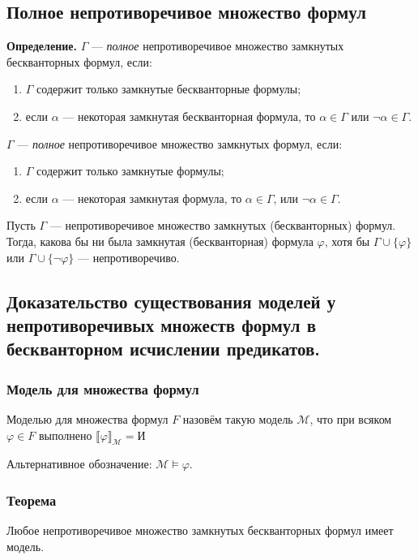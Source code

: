 \documentclass[10pt,a4paper,oneside]{article}
\begin{document}
\subsection{Полное непротиворечивое множество формул}
{\bf Определение.} $\Gamma$ --- \emph{полное} непротиворечивое множество замкнутых бескванторных формул,
если:
\begin{enumerate}\item $\Gamma$ содержит только замкнутые бескванторные формулы;
\item если $\alpha$ --- некоторая замкнутая бескванторная формула, то $\alpha\in\Gamma$ или $\neg\alpha\in\Gamma$.
\end{enumerate}

 $\Gamma$ --- \emph{полное} непротиворечивое множество замкнутых формул, если:
\begin{enumerate}\item $\Gamma$ содержит только замкнутые формулы;
\item если $\alpha$ --- некоторая замкнутая формула, то $\alpha \in \Gamma$, или $\neg\alpha \in \Gamma$.
\end{enumerate}

 Пусть $\Gamma$ --- непротиворечивое множество замкнутых (бескванторных) формул. Тогда, какова бы ни была
замкнутая (бескванторная) формула $\varphi$, хотя бы $\Gamma \cup \{\varphi\}$ или $\Gamma \cup \{\neg\varphi\}$ ---
непротиворечиво.

\subsection{Доказательство существования моделей у непротиворечивых множеств формул 
в бескванторном исчислении предикатов.}
\subsubsection{Модель для множества формул}
 Моделью для множества формул $F$ назовём такую модель $\mathcal{M}$, что
    при всяком $\varphi \in F$ выполнено $\llbracket\varphi\rrbracket_\mathcal{M} = \text{И}$
    
\noindent Альтернативное обозначение: $\mathcal{M}\models\varphi$.

\subsubsection{Теорема}
 Любое непротиворечивое множество замкнутых бескванторных формул имеет модель.    
\end{document}
